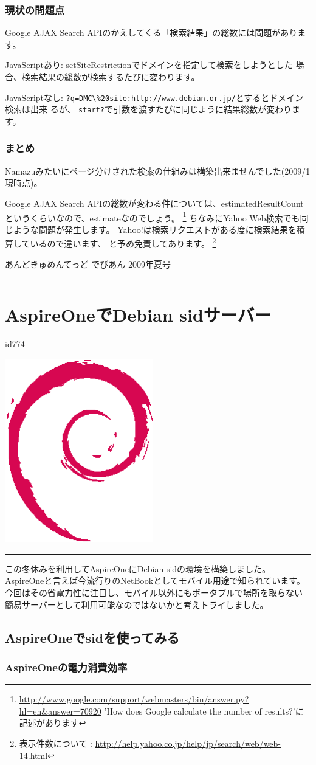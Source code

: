 \documentclass[mingoth,a4paper]{jsarticle}
\renewcommand{\dancersection}[2]{%
\newpage
あんどきゅめんてっど でびあん 2009年夏号
%
\vspace{0.1mm}\\
{\color{dancerlightblue}\rule{\hsize}{2mm}}

%
%
\begin{minipage}[t]{0.6\hsize}
\color{dancerdarkblue}
\vspace{1cm}
\section{#1}
\hfill{}#2\\
\end{minipage}
\begin{minipage}[t]{0.4\hsize}
\vspace{-2cm}
\hfill{}\includegraphics[height=8cm]{image200502/openlogo-nd.eps}\\
\vspace{-5cm}
\end{minipage}
%
%
{\color{dancerdarkblue}\rule{0.74\hsize}{2mm}}
%
\vspace{2cm}
}
\begin{document}
\subsubsection{現状の問題点}

Google AJAX Search APIのかえしてくる「検索結果」の総数には問題があります。

JavaScriptあり:
setSiteRestrictionでドメインを指定して検索をしようとした
場合、検索結果の総数が検索するたびに変わります。

JavaScriptなし:
\verb!?q=DMC\%20site:http://www.debian.or.jp/!とするとドメイン検索は出来
るが、
\verb!start?!で引数を渡すたびに同じように結果総数が変わります。

\subsubsection{まとめ}

Namazuみたいにページ分けされた検索の仕組みは構築出来ませんでした(2009/1
現時点)。

Google AJAX Search APIの総数が変わる件については、estimatedResultCount
というくらいなので、estimateなのでしょう。
\footnote{\url{http://www.google.com/support/webmasters/bin/answer.py?hl=en&answer=70920}
'How does Google calculate the number of results?'に記述があります}
ちなみにYahoo Web検索でも同じような問題が発生します。
Yahoo!は検索リクエストがある度に検索結果を積算しているので違います、
と予め免責してあります。
\footnote{表示件数について :
\url{http://help.yahoo.co.jp/help/jp/search/web/web-14.html}}

\dancersection{AspireOneでDebian sidサーバー}{id774}

この冬休みを利用してAspireOneにDebian sidの環境を構築しました。
AspireOneと言えば今流行りのNetBookとしてモバイル用途で知られています。
今回はその省電力性に注目し、モバイル以外にもポータブルで場所を取らない
簡易サーバーとして利用可能なのではないかと考えトライしました。

\subsection{AspireOneでsidを使ってみる}

\subsubsection{AspireOneの電力消費効率}
\end{document}
